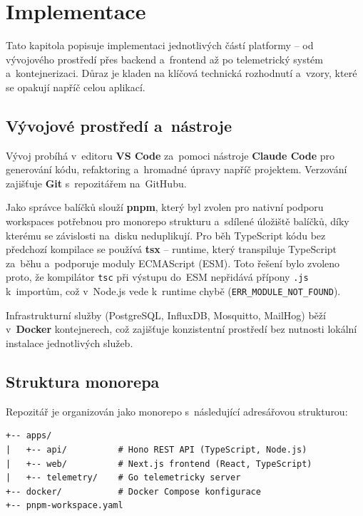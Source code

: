 \chapter{Implementace}
\label{chap:implementace}

Tato kapitola popisuje implementaci jednotlivých částí platformy -- od vývojového prostředí přes backend a~frontend až po telemetrický systém a~kontejnerizaci. Důraz je kladen na klíčová technická rozhodnutí a~vzory, které se opakují napříč celou aplikací.

\section{Vývojové prostředí a~nástroje}

Vývoj probíhá v~editoru \textbf{VS Code} za~pomoci nástroje \textbf{Claude Code} pro generování kódu, refaktoring a~hromadné úpravy napříč projektem. Verzování zajišťuje \textbf{Git} s~repozitářem na~GitHubu.

Jako správce balíčků slouží \textbf{pnpm}, který byl zvolen pro nativní podporu workspaces potřebnou pro monorepo strukturu a~sdílené úložiště balíčků, díky kterému se závislosti na~disku neduplikují. Pro běh TypeScript kódu bez předchozí kompilace se používá \textbf{tsx} -- runtime, který transpiluje TypeScript za~běhu a~podporuje moduly ECMAScript (ESM). Toto řešení bylo zvoleno proto, že kompilátor \texttt{tsc} při výstupu do~ESM nepřidává přípony \texttt{.js} k~importům, což v~Node.js vede k~runtime chybě (\texttt{ERR\_\allowbreak MODULE\_\allowbreak NOT\_\allowbreak FOUND}).

Infrastrukturní služby (PostgreSQL, InfluxDB, Mosquitto, MailHog) běží v~\textbf{Docker} kontejnerech, což zajišťuje konzistentní prostředí bez nutnosti lokální instalace jednotlivých služeb.

\section{Struktura monorepa}

Repozitář je organizován jako monorepo s~následující adresářovou strukturou:

\begin{verbatim}
+-- apps/
|   +-- api/          # Hono REST API (TypeScript, Node.js)
|   +-- web/          # Next.js frontend (React, TypeScript)
|   +-- telemetry/    # Go telemetricky server
+-- docker/           # Docker Compose konfigurace
+-- pnpm-workspace.yaml
\end{verbatim}

